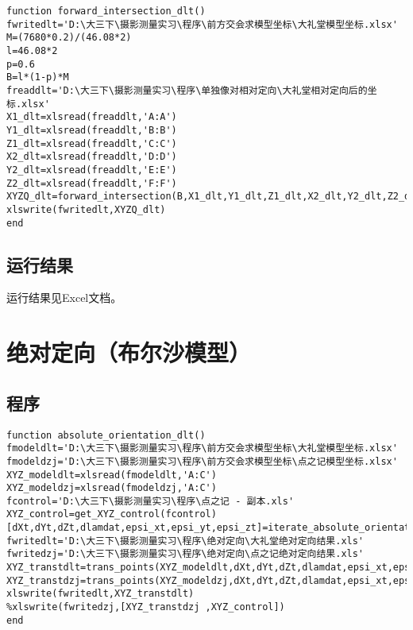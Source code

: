 \begin{lstlisting}[caption=forward\_intersection\_dlt.m]
function forward_intersection_dlt()
fwritedlt='D:\大三下\摄影测量实习\程序\前方交会求模型坐标\大礼堂模型坐标.xlsx'
M=(7680*0.2)/(46.08*2)
l=46.08*2
p=0.6
B=l*(1-p)*M
freaddlt='D:\大三下\摄影测量实习\程序\单独像对相对定向\大礼堂相对定向后的坐标.xlsx'
X1_dlt=xlsread(freaddlt,'A:A')
Y1_dlt=xlsread(freaddlt,'B:B')
Z1_dlt=xlsread(freaddlt,'C:C')
X2_dlt=xlsread(freaddlt,'D:D')
Y2_dlt=xlsread(freaddlt,'E:E')
Z2_dlt=xlsread(freaddlt,'F:F')
XYZQ_dlt=forward_intersection(B,X1_dlt,Y1_dlt,Z1_dlt,X2_dlt,Y2_dlt,Z2_dlt)
xlswrite(fwritedlt,XYZQ_dlt)
end
\end{lstlisting}

\subsection{运行结果}

运行结果见Excel文档。

\section{绝对定向（布尔沙模型）}

\subsection{程序}

\begin{lstlisting}[caption=absolute\_orientation\_dlt.m]
function absolute_orientation_dlt()
fmodeldlt='D:\大三下\摄影测量实习\程序\前方交会求模型坐标\大礼堂模型坐标.xlsx'
fmodeldzj='D:\大三下\摄影测量实习\程序\前方交会求模型坐标\点之记模型坐标.xlsx'
XYZ_modeldlt=xlsread(fmodeldlt,'A:C')
XYZ_modeldzj=xlsread(fmodeldzj,'A:C')
fcontrol='D:\大三下\摄影测量实习\程序\点之记 - 副本.xls'
XYZ_control=get_XYZ_control(fcontrol)
[dXt,dYt,dZt,dlamdat,epsi_xt,epsi_yt,epsi_zt]=iterate_absolute_orientation(XYZ_modeldzj,XYZ_control,0,0,0,0,0,0,0)
fwritedlt='D:\大三下\摄影测量实习\程序\绝对定向\大礼堂绝对定向结果.xls'
fwritedzj='D:\大三下\摄影测量实习\程序\绝对定向\点之记绝对定向结果.xls'
XYZ_transtdlt=trans_points(XYZ_modeldlt,dXt,dYt,dZt,dlamdat,epsi_xt,epsi_yt,epsi_zt)
XYZ_transtdzj=trans_points(XYZ_modeldzj,dXt,dYt,dZt,dlamdat,epsi_xt,epsi_yt,epsi_zt)
xlswrite(fwritedlt,XYZ_transtdlt)
%xlswrite(fwritedzj,[XYZ_transtdzj ,XYZ_control])
end
\end{lstlisting}

